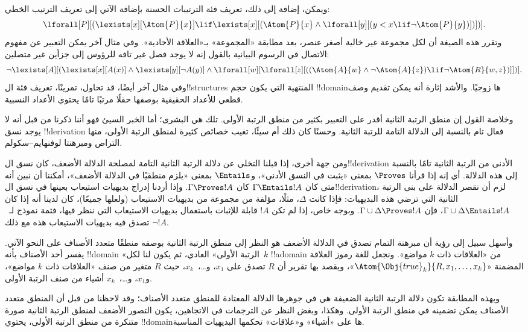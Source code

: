 \documentclass[../../../include/open-logic-section]{subfiles}
\begin{document}
ويمكن، إضافة إلى ذلك، تعريف فئة الترتيبات الحسنة بإضافة الآتي إلى
تعريف الترتيب الخطي:
\[
\lforall[P][(\lexists[x][\Atom{P}{x}] \lif \lexists[x][(\Atom{P}{x}
    \land \lforall[y][(y < x \lif \lnot \Atom{P}{y})])])].
\]
وتقرر هذه الصيغة أن لكل مجموعة غير خالية أصغر عنصر، بعد مطابقة
«المجموعة» بـ«العلاقة الأحادية». وفي مثال آخر يمكن التعبير عن مفهوم
الاتصال في الرسوم البيانية بالقول إنه لا يوجد فصل غير تافه للرؤوس إلى
جزأين غير متصلين:
\[
\lnot \lexists[A][(\lexists[x][A(x)] \land \lexists[y][\lnot A(y)]
  \land \lforall[w][\lforall[z][((\Atom{A}{w} \land \lnot \Atom{A}{z})
      \lif \lnot \Atom{R}{w,z})]])].
\]
وفي مثال آخر أيضًا، قد تحاول، تمرينًا، تعريف فئة ال!!{structure}s
المنتهية التي يكون حجم !!{domain}ها زوجيًا. والأشد إثارة أنه يمكن تقديم
وصف قطعي للأعداد الحقيقية بوصفها حقلًا مرتبًا تامًا يحتوي الأعداد
النسبية.

وخلاصة القول إن منطق الرتبة الثانية أقدر على التعبير بكثير من منطق
الرتبة الأولى. تلك هي البشرى؛ أما الخبر السيئ فهو أننا ذكرنا من قبل
أنه لا يوجد نسق !!{derivation} فعال تام بالنسبة إلى الدلالة التامة
للرتبة الثانية. وحسنًا كان ذلك أم سيئًا، تغيب خصائص كثيرة لمنطق الرتبة
الأولى، منها التراص ومبرهنتا لوفنهايم--سكولم.

ومن جهة أخرى، إذا قبلنا التخلي عن دلالة الرتبة الثانية التامة لمصلحة
الدلالة الأضعف، كان نسق ال!!{derivation} الأدنى من الرتبة الثانية تامًا
بالنسبة إلى هذه الدلالة. أي إنه إذا قرأنا $\Proves$ بمعنى «يثبت في
النسق الأدنى»، و$\Entails$ بمعنى «يلزم منطقيًا في الدلالة الأضعف»،
أمكننا أن نبين أنه متى كان $\Gamma \Entails !A$ كان $\Gamma \Proves
!A$. وإذا أردنا إدراج بديهيات استيعاب بعينها في نسق ال!!{derivation}،
لزم أن نقصر الدلالة على بنى الرتبة الثانية التي ترضي هذه البديهيات:
فإذا كانت $\Delta$، مثلًا، مؤلفة من مجموعة من بديهيات الاستيعاب
(ولعلها جميعًا)، كان لدينا أنه إذا كان $\Gamma \cup \Delta \Entails
!A$، فإن $\Gamma \cup \Delta \Proves !A$. وبوجه خاص، إذا لم تكن
$!A$ قابلة للإثبات باستعمال بديهيات الاستيعاب التي ننظر فيها، فثمة
نموذج لـ~$\lnot !A$ تصدق فيه بديهيات الاستيعاب هذه مع ذلك.

وأسهل سبيل إلى رؤية أن مبرهنة التمام تصدق في الدلالة الأضعف هو النظر
إلى منطق الرتبة الثانية بوصفه منطقًا متعدد الأصناف على النحو الآتي.
يفسر أحد الأصناف بأنه !!{domain} «الرتبة الأولى» العادي، ثم يكون لنا
لكل~$k$ !!a{domain} من «العلاقات ذات $k$ مواضع». ونجعل للغة رموز
العلاقة المضمنة «$\Atom{\Obj{true}_k}{R,x_1,\dots,x_k}$»، ويقصد بها
تقرير أن $R$ تصدق على $x_1$، و\dots،~$x_k$، حيث $R$ متغير من صنف
«العلاقات ذات $k$ مواضع»، و$x_1$، و\dots،~$x_k$ أشياء من صنف الرتبة
الأولى.

وبهذه المطابقة تكون دلالة الرتبة الثانية الضعيفة هي في جوهرها الدلالة
المعتادة للمنطق متعدد الأصناف؛ وقد لاحظنا من قبل أن المنطق متعدد
الأصناف يمكن تضمينه في منطق الرتبة الأولى. وهكذا، وبغض النظر عن
الترجمات في الاتجاهين، يكون التصور الأضعف لمنطق الرتبة الثانية صورة
متنكرة من منطق الرتبة الأولى، يحتوي !!{domain}ها على «أشياء» و«علاقات»
تحكمها البديهيات المناسبة.
\end{document}
